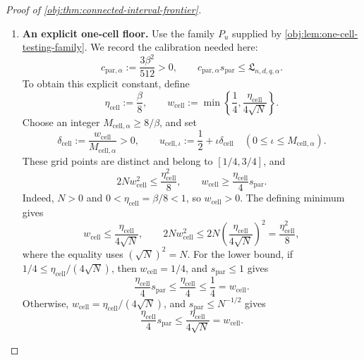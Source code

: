 \documentclass[11pt]{article}
\begin{document}
\begin{proof}[Proof of \cref{obj:thm:connected-interval-frontier}]
\begin{enumerate}
To express the separation in terms of \(d\), split according to the
minimum defining \(J\). If
\(d-1\le\lfloor(2b_0)^{-1}\rfloor\), then \(J=d-1\), and
\(J\ge D_{\mathrm{act},\alpha}\ge1\) implies \(d\ge2\) and
\(J\ge d/2\). Otherwise,
\(J=\lfloor(2b_0)^{-1}\rfloor\), and
\[
Jb_0\ge\frac12-b_0\ge\frac14.
\]
In both cases,
\[
Jb_0\ge\min\left\{\frac{db_0}{2},\frac14\right\}.
\]
Since \(\eta\le1/2\), the two inequalities
\[
\frac{\eta}{24}s_{\mathrm{many}}
\le\frac{db_0}{24},
\qquad
\frac{\eta}{24}s_{\mathrm{many}}
\le\frac1{48}
\]
give
\[
\frac{\eta}{24}s_{\mathrm{many}}
\le
\frac1{12}\min\left\{\frac{db_0}{2},\frac14\right\}
\le\frac{Jb_0}{12}
\le\Delta_{\mathrm{act}}.
\]
Consequently,
\[
c_{\mathrm{act},\alpha}s_{\mathrm{many}}
\le\mathfrak L_{n,d,q,\alpha}
\qquad
(N\ge T_{\mathrm{act},\alpha},\ J\ge D_{\mathrm{act},\alpha}).
\]

\item \textbf{An explicit one-cell floor.}
Use the family \(P_u\) supplied by
\cref{obj:lem:one-cell-testing-family}. We record the calibration needed
here:
\[
c_{\mathrm{par},\alpha}:=\frac{3\beta^2}{512}>0,
\qquad
c_{\mathrm{par},\alpha}s_{\mathrm{par}}
\le\mathfrak L_{n,d,q,\alpha}.
\]
To obtain this explicit constant, define
\[
\eta_{\mathrm{cell}}:=\frac\beta8,\qquad
w_{\mathrm{cell}}
:=\min\left\{\frac14,\frac{\eta_{\mathrm{cell}}}{4\sqrt N}\right\}.
\]
Choose an integer \(M_{\mathrm{cell},\alpha}\ge8/\beta\), and set
\[
\delta_{\mathrm{cell}}
:=\frac{w_{\mathrm{cell}}}{M_{\mathrm{cell},\alpha}}>0,
\qquad
u_{\mathrm{cell},\iota}
:=\frac12+\iota\delta_{\mathrm{cell}}
\quad(0\le\iota\le M_{\mathrm{cell},\alpha}).
\]
These grid points are distinct and belong to \([1/4,3/4]\), and
\[
2Nw_{\mathrm{cell}}^2\le\frac{\eta_{\mathrm{cell}}^2}{8},
\qquad
w_{\mathrm{cell}}\ge
\frac{\eta_{\mathrm{cell}}}{4}s_{\mathrm{par}}.
\]
Indeed, \(N>0\) and \(0<\eta_{\mathrm{cell}}=\beta/8<1\), so
\(w_{\mathrm{cell}}>0\). The defining minimum gives
\[
w_{\mathrm{cell}}\le\frac{\eta_{\mathrm{cell}}}{4\sqrt N},
\qquad
2Nw_{\mathrm{cell}}^2
\le 2N\left(\frac{\eta_{\mathrm{cell}}}{4\sqrt N}\right)^2
=\frac{\eta_{\mathrm{cell}}^2}{8},
\]
where the equality uses \((\sqrt N)^2=N\). For the lower bound, if
\(1/4\le\eta_{\mathrm{cell}}/(4\sqrt N)\), then
\(w_{\mathrm{cell}}=1/4\), and \(s_{\mathrm{par}}\le1\) gives
\[
\frac{\eta_{\mathrm{cell}}}{4}s_{\mathrm{par}}
\le\frac{\eta_{\mathrm{cell}}}{4}
\le\frac14=w_{\mathrm{cell}}.
\]
Otherwise, \(w_{\mathrm{cell}}=\eta_{\mathrm{cell}}/(4\sqrt N)\),
and \(s_{\mathrm{par}}\le N^{-1/2}\) gives
\[
\frac{\eta_{\mathrm{cell}}}{4}s_{\mathrm{par}}
\le\frac{\eta_{\mathrm{cell}}}{4\sqrt N}
=w_{\mathrm{cell}}.
\]


\end{enumerate}
\end{proof}
\end{document}
